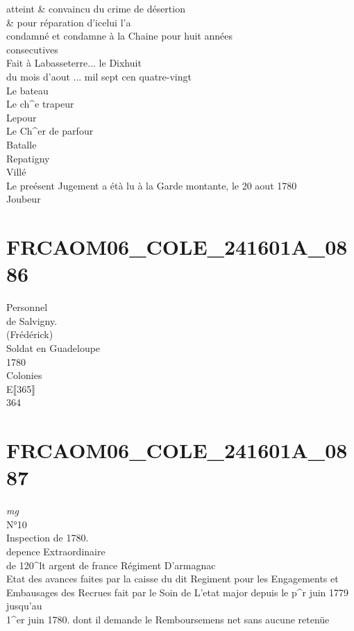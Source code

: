 \documentclass{article}
\begin{document}
\begin{pages}
atteint \& convaincu du crime de désertion\\
\& pour réparation d'icelui l'a\\
condamné et condamne à la Chaine pour huit années\\
consecutives\\
Fait à Labasseterre... le Dixhuit\\
du mois d'aout ... mil sept cen quatre-vingt\\
Le bateau\\
Le ch\^{}e trapeur\\
Lepour\\
Le Ch\^{}er de parfour\\
Batalle\\
Repatigny\\
Villé\\
Le preésent Jugement a étà lu à la Garde montante, le 20 aout 1780\\
Joubeur
\pend
\endnumbering\beginnumbering\section{FRCAOM06\_COLE\_241601A\_0886}\pstart
Personnel\\
de Salvigny.\\
(Frédérick)\\
Soldat en Guadeloupe\\
1780\\
Colonies\\
E⟦365⟧\\
364
\pend
\endnumbering\beginnumbering\section{FRCAOM06\_COLE\_241601A\_0887}
\vspace{0.5cm}\noindent
\textit{mg}
\footnotesize \\
N°10\\
Inspection de 1780.\\
depence Extraordinaire\\
de 120\^{}lt argent de france
\normalsize \pstart
Régiment D'armagnac\\
Etat des avances faites par la caisse du dit Regiment pour les Engagements et\\
Embausages des Recrues fait par le Soin de L'etat major depuis le p\^{}r juin 1779 jusqu'au\\
1\^{}er juin 1780. dont il demande le Remboursemens net sans aucune retenüe\\

\end{pages}
\end{document}
